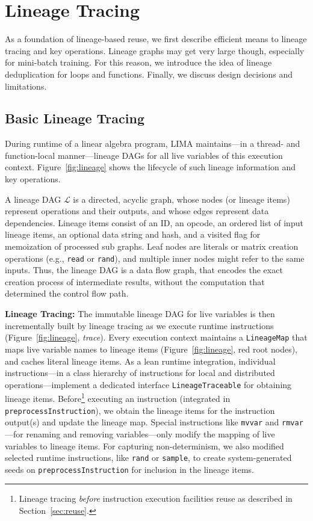\section{Lineage Tracing}
\label{sec:lic}

As a foundation of lineage-based reuse, we first describe efficient means to lineage tracing and key operations. Lineage graphs may get very large though, especially for mini-batch training. For this reason, we introduce the idea of lineage deduplication for loops and functions. Finally, we discuss design decisions and limitations.

\subsection{Basic Lineage Tracing}
\label{sec:tracing}

During runtime of a linear algebra program, LIMA maintains---in a thread- and function-local manner---lineage DAGs for all live variables of this execution context. Figure~\ref{fig:lineage} shows the lifecycle of such lineage information and key operations.

\begin{definition2} A lineage DAG $\mathcal{L}$ is a directed, acyclic graph, whose nodes (or lineage items) represent operations and their outputs, and whose edges represent data dependencies. Lineage items consist of an ID, an opcode, an ordered list of input lineage items, an optional data string and hash, and a visited flag for memoization of processed sub graphs. Leaf nodes are literals or matrix creation operations (e.g., \texttt{read} or \texttt{rand}), and multiple inner nodes might refer to the same inputs. Thus, the lineage DAG is a data flow graph, that encodes the exact creation process of intermediate results, without the computation that determined the control flow path.
\end{definition2}

\textbf{Lineage Tracing:} The immutable lineage DAG for live variables is then incrementally built by lineage tracing as we execute runtime instructions (Figure~\ref{fig:lineage}, \emph{trace}). Every execution context maintains a \texttt{LineageMap} that maps live variable names to lineage items (Figure~\ref{fig:lineage}, red root nodes), and caches literal lineage items. As a lean runtime integration, individual instructions---in a class hierarchy of instructions for local and distributed operations---implement a dedicated interface \texttt{LineageTraceable} for obtaining lineage items. Before\footnote{Lineage tracing \emph{before} instruction execution facilities reuse as described in Section~\ref{sec:reuse}.} executing an instruction (integrated in \texttt{preprocessInstruction}), we obtain the lineage items for the instruction output(s) and update the lineage map. Special instructions like \texttt{mvvar} and \texttt{rmvar}---for renaming and removing variables---only modify the mapping of live variables to lineage items. For capturing non-determinism, we also modified selected runtime instructions, like \texttt{rand} or \texttt{sample}, to create system-generated seeds on \texttt{preprocessInstruction} for inclusion in the lineage items.

